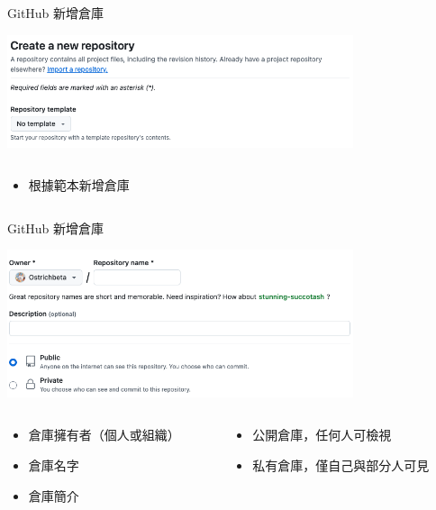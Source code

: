 \documentclass[xetex, unicode, 10pt, aspectratio=169]{beamer}
\begin{document}
\begin{frame}{GitHub 新增倉庫}
    \begin{center}
        \includegraphics[width=4in]{./img/github-create-repo-0.png}
    \end{center}

    \begin{columns}
        \begin{column}{6in}
            \begin{itemize}
                \item {}\quad 根據範本新增倉庫
            \end{itemize}
        \end{column}
    \end{columns}
\end{frame}

\begin{frame}{GitHub 新增倉庫}
    \begin{center}
        \includegraphics[width=4in]{./img/github-create-repo-1.png}

        \begin{columns}
            \begin{column}{3in}
                \begin{itemize}
                    \item {}\quad 倉庫擁有者（個人或組織）
                    \item {}\quad 倉庫名字
                    \item {}\quad 倉庫簡介
                \end{itemize}
            \end{column}

            \begin{column}{3in}
                \begin{itemize}
                    \item {}\quad 公開倉庫，任何人可檢視
                    \item {}\quad 私有倉庫，僅自己與部分人可見
                \end{itemize}
            \end{column}
        \end{columns}
    \end{center}
\end{frame}
\end{document}
